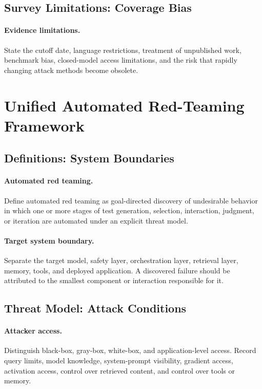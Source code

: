 \documentclass[review]{fcs}
\begin{document}
\subsection{Survey Limitations: Coverage Bias}

\paragraph{Evidence limitations.}
State the cutoff date, language restrictions, treatment of unpublished work, benchmark bias, closed-model access limitations, and the risk that rapidly changing attack methods become obsolete.

\section{Unified Automated Red-Teaming Framework}
\label{sec:framework}

\subsection{Definitions: System Boundaries}

\paragraph{Automated red teaming.}
Define automated red teaming as goal-directed discovery of undesirable behavior in which one or more stages of test generation, selection, interaction, judgment, or iteration are automated under an explicit threat model.

\paragraph{Target system boundary.}
Separate the target model, safety layer, orchestration layer, retrieval layer, memory, tools, and deployed application. A discovered failure should be attributed to the smallest component or interaction responsible for it.

\subsection{Threat Model: Attack Conditions}

\paragraph{Attacker access.}
Distinguish black-box, gray-box, white-box, and application-level access. Record query limits, model knowledge, system-prompt visibility, gradient access, activation access, control over retrieved content, and control over tools or memory.
\end{document}
